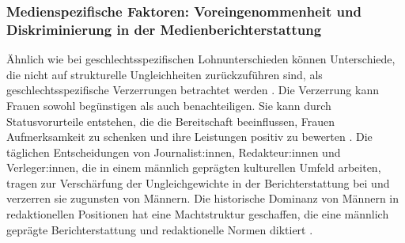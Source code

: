 \subsubsection{Medienspezifische Faktoren: Voreingenommenheit und Diskriminierung in der Medienberichterstattung}
Ähnlich wie bei geschlechtsspezifischen Lohnunterschieden können Unterschiede, die nicht auf strukturelle 
Ungleichheiten zurückzuführen sind, als geschlechtsspezifische Verzerrungen betrachtet werden 
\cite{gender_stereotyping,gender_gap_lawyers}. %
Die Verzerrung kann Frauen sowohl begünstigen als auch benachteiligen. 
Sie kann durch Statusvorurteile entstehen, die die Bereitschaft beeinflussen, Frauen Aufmerksamkeit 
zu schenken und ihre Leistungen positiv zu bewerten \cite{status_matters_for_inequality,unpacking_gender_system,social_difference_status_distinction}. %
Die täglichen Entscheidungen von Journalist:innen, Redakteur:innen und Verleger:innen, die in einem männlich geprägten 
kulturellen Umfeld arbeiten, tragen zur Verschärfung der Ungleichgewichte in der Berichterstattung 
bei und verzerren sie zugunsten von Männern. 
Die historische Dominanz von Männern in redaktionellen Positionen hat eine Machtstruktur geschaffen, 
die eine männlich geprägte Berichterstattung und redaktionelle Normen diktiert \cite{female_reporting,women_and_news}. %



